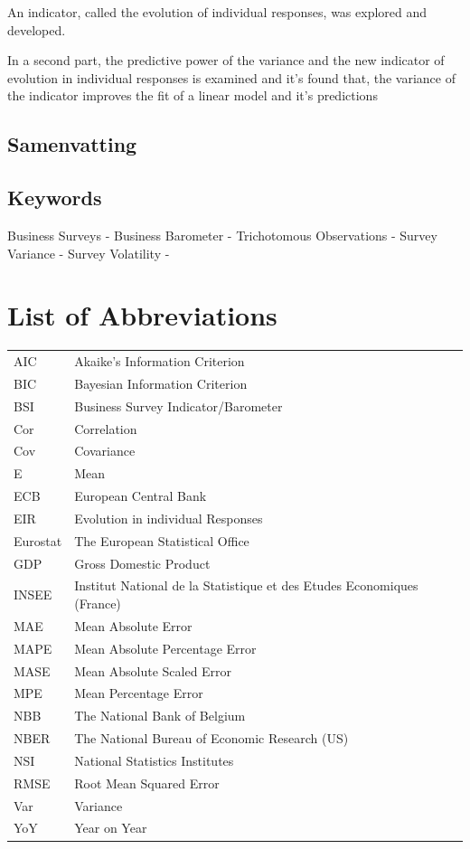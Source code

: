 \documentclass[12pt,a4paper,oneside]{book}
\begin{document}
An indicator, called the evolution of individual responses, was explored and developed.

In a second part, the predictive power of the variance and the new indicator of evolution in individual responses is examined and it's found that, the variance of the indicator improves the fit of a linear model and it's predictions


\section*{Samenvatting}


\section*{Keywords}
Business Surveys - 
Business Barometer -
Trichotomous Observations -
Survey Variance - 
Survey Volatility -


\chapter*{List of Abbreviations}

\begin{tabular}{l l}
  AIC       & Akaike's Information Criterion \\
  BIC		& Bayesian Information Criterion \\
  BSI       & Business Survey Indicator/Barometer \\
  Cor       & Correlation \\
  Cov       & Covariance \\
  E         & Mean \\
  ECB       & European Central Bank \\
  EIR       & Evolution in individual Responses \\
  Eurostat  & The European Statistical Office \\
  GDP       & Gross Domestic Product \\
  INSEE     & Institut National de la Statistique et des Etudes Economiques (France) \\
  MAE 		& Mean Absolute Error \\
  MAPE		& Mean Absolute Percentage Error \\
  MASE 		& Mean Absolute Scaled Error \\
  MPE 		& Mean Percentage Error \\
  NBB       & The National Bank of Belgium \\
  NBER      & The National Bureau of Economic Research (US) \\
  NSI       & National Statistics Institutes \\
  RMSE 		& Root Mean Squared Error \\
  Var       & Variance \\
  YoY       & Year on Year \\
\end{tabular}
\end{document}
